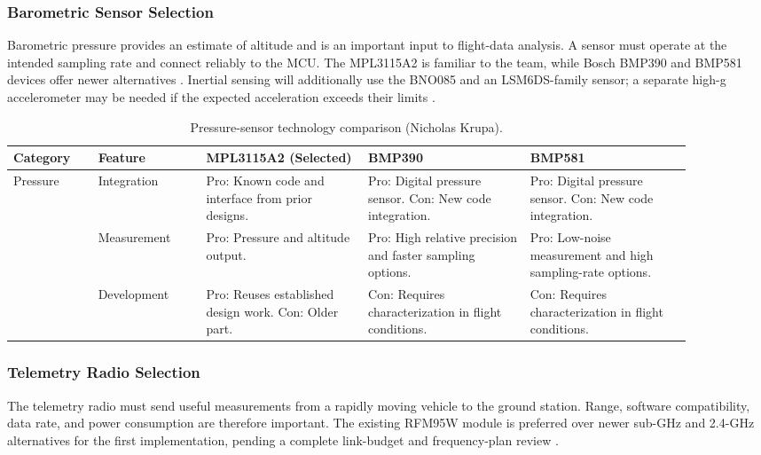 \documentclass[11pt]{IEEEtran}
\begin{document}
\subsubsection{Barometric Sensor Selection}
Barometric pressure provides an estimate of altitude and is an important input to flight-data analysis. A sensor must operate at the intended sampling rate and connect reliably to the MCU. The MPL3115A2 is familiar to the team, while Bosch BMP390 and BMP581 devices offer newer alternatives \cite{mpl,bmp390,bmp581}. Inertial sensing will additionally use the BNO085 and an LSM6DS-family sensor; a separate high-g accelerometer may be needed if the expected acceleration exceeds their limits \cite{bno085,lsm,adxl}.

\begin{table}[H]
\centering\small
\begin{tabular}{@{}p{0.115\linewidth}p{0.145\linewidth}p{0.21\linewidth}p{0.21\linewidth}p{0.21\linewidth}@{}}
\toprule
\textbf{Category} & \textbf{Feature} & \textbf{MPL3115A2 (Selected)} & \textbf{BMP390} & \textbf{BMP581} \\
\midrule
\multirow{3}{*}{Pressure}
 & Integration & Pro: Known code and interface from prior designs. & Pro: Digital pressure sensor. Con: New code integration. & Pro: Digital pressure sensor. Con: New code integration. \\ \cmidrule{2-5}
 & Measurement & Pro: Pressure and altitude output. & Pro: High relative precision and faster sampling options. & Pro: Low-noise measurement and high sampling-rate options. \\ \cmidrule{2-5}
 & Development & Pro: Reuses established design work. Con: Older part. & Con: Requires characterization in flight conditions. & Con: Requires characterization in flight conditions. \\
\bottomrule
\end{tabular}
\vspace{3mm}
\caption{Pressure-sensor technology comparison (Nicholas Krupa).}
\label{tab:Pressure_Comparison}
\end{table}

\subsubsection{Telemetry Radio Selection}
The telemetry radio must send useful measurements from a rapidly moving vehicle to the ground station. Range, software compatibility, data rate, and power consumption are therefore important. The existing RFM95W module is preferred over newer sub-GHz and 2.4-GHz alternatives for the first implementation, pending a complete link-budget and frequency-plan review \cite{rfm95,sx1262,sx1280}.
\end{document}
